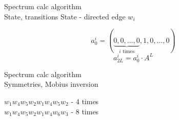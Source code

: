 \documentclass[t,13pt,graphics=pdflatex,xcolor=table,aspectratio=43]{beamer}
\begin{document}
\begin{frame}{Spectrum calc algorithm \\ State, transitions}
  State - directed edge $w_i$\\
  \begin{minipage}{0.35\textwidth}
    \centering
    \scalebox{0.7}{}
  \end{minipage}
  \begin{minipage}{0.60\textwidth}
  \end{minipage}
\[
a_0^i=(\underbrace{0,0,...,0}_{i \text{ times}},1,0,...,0)
\]
\[
a_{2L}^i=a_0^i \cdot A^L
\]
\end{frame}

\begin{frame}{Spectrum calc algorithm \\ Symmetries, Mobius inversion}
  \begin{minipage}{0.45\textwidth}
    \centering
    
  \end{minipage}\hfill
  \begin{minipage}{0.50\textwidth}
    $w_1w_4w_5w_2w_1w_4w_5w_2$ - 4 times \\
    $w_1w_4w_5w_2w_1w_4w_6w_3$ - 8 times
  \end{minipage}
\end{frame}
\end{document}
